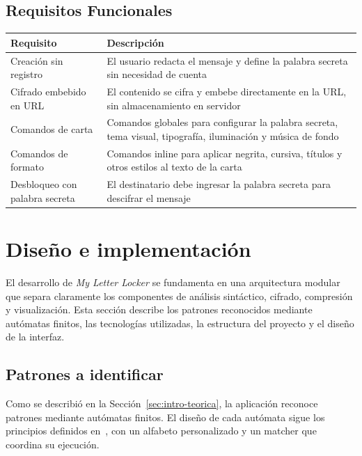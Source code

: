 \documentclass[12pt,letterpaper]{article}
\begin{document}
\subsection{Requisitos Funcionales}

\begin{table}[H]
	\centering
	\begin{tabularx}{\textwidth}{p{3.5cm}X}
		\toprule
		\textbf{Requisito}             & \textbf{Descripción}                                                                                         \\
		\midrule
		Creación sin registro          & El usuario redacta el mensaje y define la palabra secreta sin necesidad de cuenta                            \\
		\addlinespace[0.6cm]
		Cifrado embebido en URL        & El contenido se cifra y embebe directamente en la URL, sin almacenamiento en servidor                        \\
		\addlinespace[0.6cm]
		Comandos de carta              & Comandos globales para configurar la palabra secreta, tema visual, tipografía, iluminación y música de fondo \\
		\addlinespace[0.6cm]
		Comandos de formato            & Comandos inline para aplicar negrita, cursiva, títulos y otros estilos al texto de la carta                  \\
		\addlinespace[0.6cm]
		Desbloqueo con palabra secreta & El destinatario debe ingresar la palabra secreta para descifrar el mensaje                                   \\
		\bottomrule
	\end{tabularx}
\end{table}



\section{Diseño e implementación}
El desarrollo de \emph{My Letter Locker} se fundamenta en una arquitectura modular que separa claramente los componentes de análisis sintáctico, cifrado, compresión y visualización. Esta sección describe los patrones reconocidos mediante autómatas finitos, las tecnologías utilizadas, la estructura del proyecto y el diseño de la interfaz.

\subsection{Patrones a identificar}
Como se describió en la Sección~\ref{sec:intro-teorica}, la aplicación reconoce patrones mediante autómatas finitos. El diseño de cada autómata sigue los principios definidos en~\cite{kelley1995automata}, con un alfabeto personalizado y un matcher que coordina su ejecución.
\end{document}
